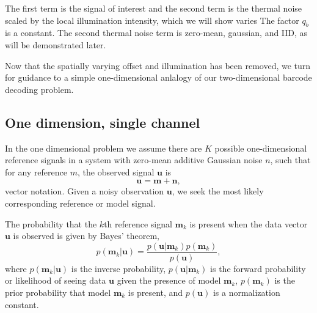The first term is the signal of interest and the second term is the thermal noise scaled by the local illumination intensity, which we will show varies The factor $q_b$ is a constant. The second thermal noise term is zero-mean, gaussian, and IID, as will be demonstrated later.

Now that the spatially varying offset and illumination has been removed, we turn for guidance to a simple one-dimensional anlalogy of our two-dimensional barcode decoding problem. 

\subsection{One dimension, single channel}
In the one dimensional problem we assume there are $K$ possible one-dimensional reference signals in a system with zero-mean additive Gaussian noise $n$, such that for any reference $m$, the observed signal $\mathbf{u}$ is
\begin{equation}
\mathbf{u}=\mathbf{m} + \mathbf{n},
\end{equation}
vector notation. Given a noisy observation $\mathbf{u}$, we seek the most likely corresponding reference or model signal. 



The probability that the $k$th reference signal $\mathbf{m}_k$ is present when the data vector $\mathbf{u}$ is observed is given by Bayes' theorem,
\begin{equation}\label{eq:Bayes}
p(\mathbf{m}_k|\mathbf{u}) = \frac{p(\mathbf{u}|\mathbf{m}_k)p(\mathbf{m}_k)} {p(\mathbf{u})},
\end{equation}
where $p(\mathbf{m}_k|\mathbf{u})$ is the inverse probability, $p(\mathbf{u}|\mathbf{m}_k)$ is the forward probability or likelihood of seeing data $\mathbf{u}$ given the presence of model $\mathbf{m}_k$, $p(\mathbf{m}_k)$ is the prior probability that model $\mathbf{m}_k$ is present, and $p(\mathbf{u})$ is a normalization constant.

